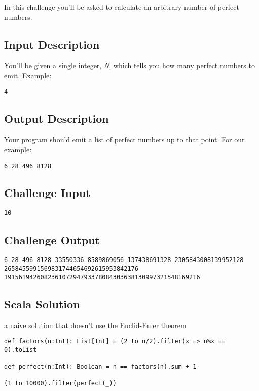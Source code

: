 In this challenge you'll be asked to calculate an arbitrary number of
perfect numbers.

\subsection{Input Description}\label{input-description-24}

You'll be given a single integer, \emph{N}, which tells you how many
perfect numbers to emit. Example:

\begin{verbatim}
4
\end{verbatim}

\subsection{Output Description}\label{output-description-26}

Your program should emit a list of perfect numbers up to that point. For
our example:

\begin{verbatim}
6 28 496 8128
\end{verbatim}

\subsection{Challenge Input}\label{challenge-input-29}

\begin{verbatim}
10
\end{verbatim}

\subsection{Challenge Output}\label{challenge-output-24}

\begin{verbatim}
6 28 496 8128 33550336 8589869056 137438691328 2305843008139952128 2658455991569831744654692615953842176 191561942608236107294793378084303638130997321548169216
\end{verbatim}

\subsection{Scala Solution}\label{scala-solution-19}

a naive solution that doesn't use the Euclid-Euler theorem

\begin{verbatim}
def factors(n:Int): List[Int] = (2 to n/2).filter(x => n%x == 0).toList

def perfect(n:Int): Boolean = n == factors(n).sum + 1

(1 to 10000).filter(perfect(_))
\end{verbatim}

